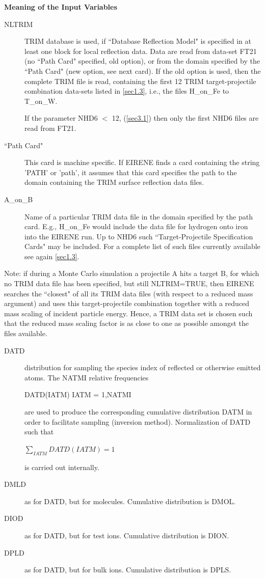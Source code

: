 \medskip

\textbf{Meaning of the Input Variables} 

\medskip 

\begin{description}
  \item[NLTRIM] TRIM database is used, if ``Database
        Reflection Model" is specified in at least one block for local reflection data.
        Data are read from data-set FT21 (no ``Path Card" specified, old option), or
        from the domain specified by the ``Path Card" (new option, see next card).
        If the old option is used, then the complete TRIM file is read, containing the
        first 12 TRIM target-projectile combination data-sets listed in \cref{sec1.3},
        i.e., the files H\_on\_Fe to T\_on\_W.

        If the parameter NHD6 $<$ 12, (\cref{sec3.1}) then only the first NHD6 files
        are read from FT21.
  \item[``Path Card"] This card is machine specific.
        If EIRENE finds a card containing the string 'PATH' or 'path', it assumes that
        this card specifies the path to the domain containing the TRIM surface
        reflection data files.
  \item[A\_on\_B] Name of a particular TRIM data file in the domain specified by
        the path card.
        E.g., H\_on\_Fe would include the data file for hydrogen onto iron into the
        EIRENE run.
        Up to NHD6 such ``Target-Projectile Specification Cards" may be included.
        For a complete list of such files currently available see again \cref{sec1.3}.
\end{description}
Note: if during a Monte Carlo simulation a projectile A hits a target B, for
which no TRIM data file has been specified, but still NLTRIM=TRUE, then EIRENE
searches the ``closest" of all its TRIM data files (with respect to a reduced
mass argument) and uses this target-projectile combination together with a
reduced mass scaling of incident particle energy.
Hence, a TRIM data set is chosen such that the reduced mass scaling factor is
as close to one as possible amongst the files available.
\begin{description}
  \item[DATD] distribution for sampling the species index of reflected or
        otherwise emitted atoms.
        The NATMI relative frequencies 

        DATD(IATM) IATM = 1,NATMI 

        are used to produce the corresponding cumulative distribution DATM in order to
        facilitate sampling (inversion method).
        Normalization of DATD such that 

        $\sum_{IATM} DATD(IATM) =1$ 

        is carried out internally.
  \item[DMLD] as for DATD, but for molecules.
        Cumulative distribution is DMOL.
  \item[DIOD] as for DATD, but for test ions.
        Cumulative distribution is DION.
  \item[DPLD] as for DATD, but for bulk ions.
        Cumulative distribution is DPLS.
\end{description}
